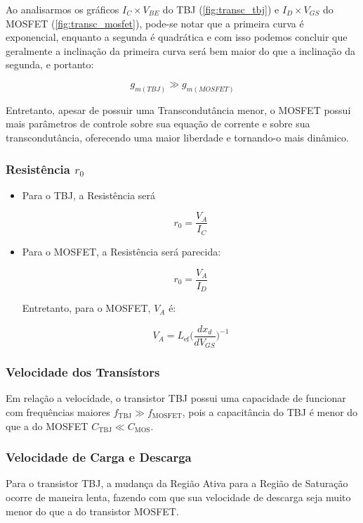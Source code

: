 \documentclass[12pt]{article}
\begin{document}
Ao analisarmos os gráficos $I_C \times V_{BE}$ do TBJ (\ref{fig:transc_tbj}) e $I_D \times V_{GS}$ do MOSFET (\ref{fig:transc_mosfet}), pode-se notar que a primeira curva é exponencial, enquanto a segunda é quadrática e com isso podemos concluir que geralmente a inclinação da primeira curva será bem maior do que a inclinação da segunda, e portanto:

$$
  g_{m(TBJ)} \gg g_{m(MOSFET)}
$$

Entretanto, apesar de possuir uma Transcondutância menor, o MOSFET possui mais parâmetros de controle sobre sua equação de corrente e sobre sua transcondutância, oferecendo uma maior liberdade e tornando-o mais dinâmico.


\subsubsection{Resistência $r_0$}

\begin{itemize}
  \item Para o TBJ, a Resistência será 

  $$
    r_0 = \frac{V_A}{I_C}
  $$

  \item Para o MOSFET, a Resistência será parecida:

  $$
    r_0 = \frac{V_A}{I_D}
  $$
  
  Entretanto, para o MOSFET, $V_A$ é:

  $$
    V_A = L_{\text{ef}} \Big ( \frac{dx_d}{dV_{GS}} \Big ) ^{-1}
  $$
  
\end{itemize}

\subsubsection{Velocidade dos Transístors}

Em relação a velocidade, o transistor TBJ possui uma capacidade de funcionar com frequências maiores $f_{\text{TBJ}} \gg f_{\text{MOSFET}}$, pois a capacitância do TBJ é menor do que a do MOSFET $C_{\text{TBJ}} \ll C_{\text{MOS}}$.

\subsubsection{Velocidade de Carga e Descarga}

Para o transistor TBJ, a mudança da Região Ativa para a Região de Saturação ocorre de maneira lenta, fazendo com que sua velocidade de descarga seja muito menor do que a do transistor MOSFET.
\end{document}
